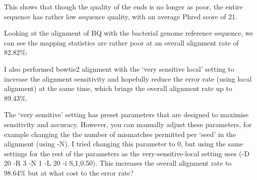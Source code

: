 \documentclass[12pt,]{article}
\newenvironment{Shaded}{\begin{snugshade}}{\end{snugshade}}
\newcommand{\FunctionTok}[1]{\textcolor[rgb]{0.00,0.00,0.00}{#1}}
\newcommand{\VariableTok}[1]{\textcolor[rgb]{0.00,0.00,0.00}{#1}}
\newcommand{\OperatorTok}[1]{\textcolor[rgb]{0.81,0.36,0.00}{\textbf{#1}}}
\newcommand{\BuiltInTok}[1]{#1}
\newcommand{\NormalTok}[1]{#1}
\begin{document}
This shows that though the quality of the ends is no longer as poor, the
entire sequence has rather low sequence quality, with an average Phred
score of 21.

Looking at the alignment of BQ with the bacterial genome reference
sequence, we can see the mapping statistics are rather poor at an
overall alignment rate of 82.82\%:

\begin{Shaded}
\end{Shaded}

I also performed bowtie2 alignment with the `very sensitive local'
setting to increase the alignment sensitivity and hopefully reduce the
error rate (using local alignment) at the same time, which brings the
overall alignment rate up to 89.43\%.

\begin{Shaded}
\end{Shaded}

The `very sensitive' setting has preset parameters that are designed to
maximise sensitivity and accuracy. However, you can manually adjust
these parameters, for example changing the the number of mismatches
permitted per `seed' in the alignment (using -N). I tried changing this
parameter to 0, but using the same settings for the rest of the
parameters as the very-sensitive-local setting uses (-D 20 -R 3 -N 1 -L
20 -i S,1,0.50). This increases the overall alignment rate to 98.64\%
but at what cost to the error rate?
\end{document}
